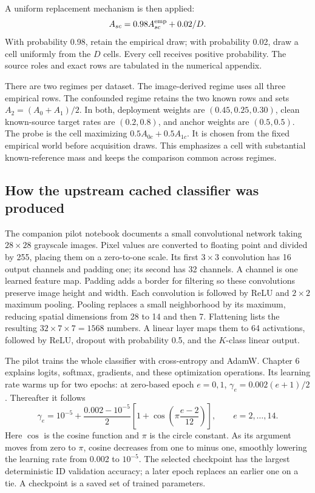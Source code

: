 \documentclass[11pt,a4paper]{report}
\begin{document}
A uniform replacement mechanism is then applied:
\begin{equation}
A_{sc}=0.98A^{\rm emp}_{sc}+0.02/D.
\end{equation}
With probability 0.98, retain the empirical draw; with probability 0.02, draw a cell uniformly from the $D$ cells. Every cell receives positive probability. The source roles and exact rows are tabulated in the numerical appendix.

There are two regimes per dataset. The image-derived regime uses all three empirical rows. The confounded regime retains the two known rows and sets $A_2=(A_0+A_1)/2$. In both, deployment weights are $(0.45,0.25,0.30)$, clean known-source target rates are $(0.2,0.8)$, and anchor weights are $(0.5,0.5)$. The probe is the cell maximizing $0.5A_{0c}+0.5A_{1c}$. It is chosen from the fixed empirical world before acquisition draws. This emphasizes a cell with substantial known-reference mass and keeps the comparison common across regimes.

\subsection{How the upstream cached classifier was produced}
The companion pilot notebook documents a small convolutional network taking $28\times28$ grayscale images. Pixel values are converted to floating point and divided by 255, placing them on a zero-to-one scale. Its first $3\times3$ convolution has 16 output channels and padding one; its second has 32 channels. A channel is one learned feature map. Padding adds a border for filtering so these convolutions preserve image height and width. Each convolution is followed by ReLU and $2\times2$ maximum pooling. Pooling replaces a small neighborhood by its maximum, reducing spatial dimensions from 28 to 14 and then 7. Flattening lists the resulting $32\times7\times7=1568$ numbers. A linear layer maps them to 64 activations, followed by ReLU, dropout with probability 0.5, and the $K$-class linear output.

The pilot trains the whole classifier with cross-entropy and AdamW. Chapter 6 explains logits, softmax, gradients, and these optimization operations. Its learning rate warms up for two epochs: at zero-based epoch $e=0,1$, $\gamma_e=0.002(e+1)/2$. Thereafter it follows
\begin{equation}
\gamma_e=10^{-5}+\frac{0.002-10^{-5}}2\left[1+\cos\left(\pi\frac{e-2}{12}\right)\right],\qquad e=2,\ldots,14.
\end{equation}
Here $\cos$ is the cosine function and $\pi$ is the circle constant. As its argument moves from zero to $\pi$, cosine decreases from one to minus one, smoothly lowering the learning rate from 0.002 to $10^{-5}$. The selected checkpoint has the largest deterministic ID validation accuracy; a later epoch replaces an earlier one on a tie. A checkpoint is a saved set of trained parameters.
\end{document}
